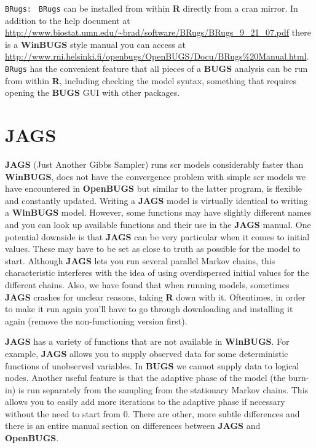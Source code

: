 {\flushleft \tt BRugs: }
{\tt BRugs} \citep{thomas_etal:2006} can be installed from within {\bf R} directly from a cran mirror. In addition to the help document at \url{http://www.biostat.umn.edu/~brad/software/BRugs/BRugs_9_21_07.pdf}  there is a {\bf WinBUGS} style manual you can access at \url{http://www.rni.helsinki.fi/openbugs/OpenBUGS/Docu/BRugs%20Manual.html}.
{\tt BRugs} has the convenient feature that all pieces of a {\bf BUGS} analysis can be run from within {\bf R}, including checking the model syntax, something that requires opening the {\bf BUGS} GUI with other packages. 



\section{JAGS}
{\bf JAGS} (Just Another Gibbs Sampler) \citep{plummer:2003} runs scr models considerably faster than {\bf WinBUGS}, does not have the convergence problem with simple scr models we have encountered in {\bf OpenBUGS} but similar to the latter program, is flexible and constantly updated. Writing a \mbox{\bf JAGS} model is virtually identical to writing a {\bf WinBUGS}
 model. However, some functions may have slightly different names and you 
 can look up available functions and their use in the {\bf JAGS} 
 manual. One potential downside is that {\bf JAGS} can be very particular 
 when it comes to initial values. These may have to be set as close to 
 truth as possible for the model to start. Although {\bf JAGS} lets 
 you run several parallel Markov chains, this characteristic interferes 
 with the idea of using overdispersed initial values for the different 
 chains. Also, we have found that when running models, sometimes {\bf JAGS} crashes for unclear reasons, taking {\bf R} down with it. Oftentimes, in order to make it run again you'll have to go through downloading and installing it again (remove the non-functioning version first).

{\bf JAGS} has a variety of functions that are 
 not available in {\bf WinBUGS}. For example, {\bf JAGS} allows you to 
 supply observed data for some deterministic functions of unobserved 
 variables. In {\bf BUGS} we cannot supply data to logical nodes. 
 Another useful feature is that the adaptive phase of the model 
 (the burn-in) is run separately from the sampling from the stationary 
 Markov chains. This allows you to easily add more iterations to the 
 adaptive phase if necessary without the need to start from 0. There 
 are other, more subtle differences and there is an entire manual section 
 on differences between {\bf JAGS} and {\bf OpenBUGS}.

